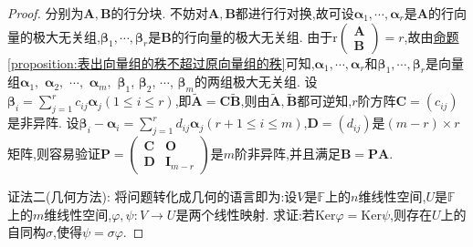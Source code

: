 \documentclass[../../main.tex]{subfiles}
\begin{document}
\begin{proof}
分别为\(\boldsymbol{A},\boldsymbol{B}\)的行分块. 不妨对\(\boldsymbol{A},\boldsymbol{B}\)都进行行对换,故可设\(\boldsymbol{\alpha}_1,\cdots,\boldsymbol{\alpha}_r\)是\(\boldsymbol{A}\)的行向量的极大无关组,\(\boldsymbol{\beta}_1,\cdots,\boldsymbol{\beta}_r\)是\(\boldsymbol{B}\)的行向量的极大无关组. 由于\(\text{r}\begin{pmatrix}\boldsymbol{A}\\\boldsymbol{B}\end{pmatrix}=r\),故由\hyperref[proposition:表出向量组的秩不超过原向量组的秩]{命题\ref{proposition:表出向量组的秩不超过原向量组的秩}}可知,\(\boldsymbol{\alpha}_1,\cdots,\boldsymbol{\alpha}_r\)和\(\boldsymbol{\beta}_1,\cdots,\boldsymbol{\beta}_r\)是向量组$\boldsymbol{\alpha}_1,$ $\boldsymbol{\alpha}_2,$ $\cdots,$ $\boldsymbol{\alpha}_m,$ $\boldsymbol{\beta}_1$, $\boldsymbol{\beta}_2$, $\cdots$, $\boldsymbol{\beta}_m$的两组极大无关组. 设\(\boldsymbol{\beta}_i=\sum_{j = 1}^{r}c_{ij}\boldsymbol{\alpha}_j(1\leqslant  i\leqslant  r)\),即$\widetilde{\boldsymbol{A}}=\boldsymbol{C}\widetilde{\boldsymbol{B}}$,则由$\widetilde{\boldsymbol{A}},\widetilde{\boldsymbol{B}}$都可逆知,\(r\)阶方阵\(\boldsymbol{C}=(c_{ij})\)是非异阵. 设\(\boldsymbol{\beta}_i-\boldsymbol{\alpha}_i=\sum_{j = 1}^{r}d_{ij}\boldsymbol{\alpha}_j(r + 1\leqslant  i\leqslant  m)\),\(\boldsymbol{D}=(d_{ij})\)是\((m - r)\times r\)矩阵,则容易验证\(\boldsymbol{P}=\begin{pmatrix}\boldsymbol{C}&\boldsymbol{O}\\\boldsymbol{D}&\boldsymbol{I}_{m - r}\end{pmatrix}\)是\(m\)阶非异阵,并且满足\(\boldsymbol{B}=\boldsymbol{P}\boldsymbol{A}\).

{\color{blue}证法二(几何方法):}  将问题转化成几何的语言即为:设\(V\)是\(\mathbb{F}\)上的\(n\)维线性空间,\(U\)是\(\mathbb{F}\)上的\(m\)维线性空间,\(\varphi,\psi:V\to U\)是两个线性映射. 求证:若\(\text{Ker}\varphi=\text{Ker}\psi\),则存在\(U\)上的自同构\(\sigma\),使得\(\psi=\sigma\varphi\).


\end{proof}
\end{document}
